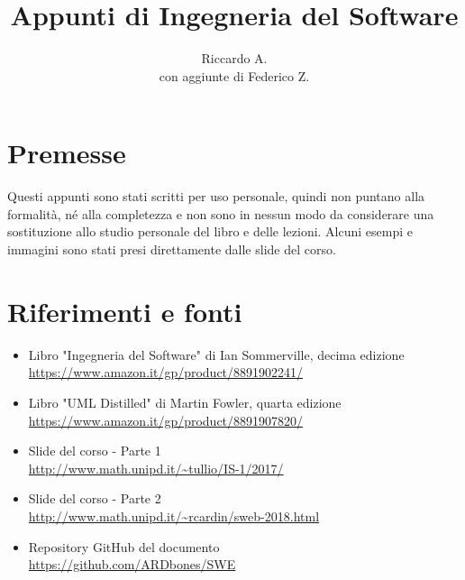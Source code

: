 

\author{Riccardo A. \\ con aggiunte di Federico Z.}
\title{Appunti di Ingegneria del Software}



\maketitle

\section*{Premesse}
Questi appunti sono stati scritti per uso personale, quindi non puntano alla formalità, né alla completezza e non sono in nessun modo da considerare una sostituzione allo studio personale del libro e delle lezioni. 
Alcuni esempi e immagini sono stati presi direttamente dalle slide del corso.

\section*{Riferimenti e fonti}
\begin{itemize}
\item Libro "Ingegneria del Software" di Ian Sommerville, decima edizione\\
\url{https://www.amazon.it/gp/product/8891902241/}
\item Libro "UML Distilled" di Martin Fowler, quarta edizione\\
\url{https://www.amazon.it/gp/product/8891907820/}
\item Slide del corso - Parte 1 \\
\url{http://www.math.unipd.it/~tullio/IS-1/2017/}
\item Slide del corso - Parte 2 \\
\url{http://www.math.unipd.it/~rcardin/sweb-2018.html}
\item Repository GitHub del documento \\
\url{https://github.com/ARDbones/SWE}
\end{itemize}

\tableofcontents
\newpage



